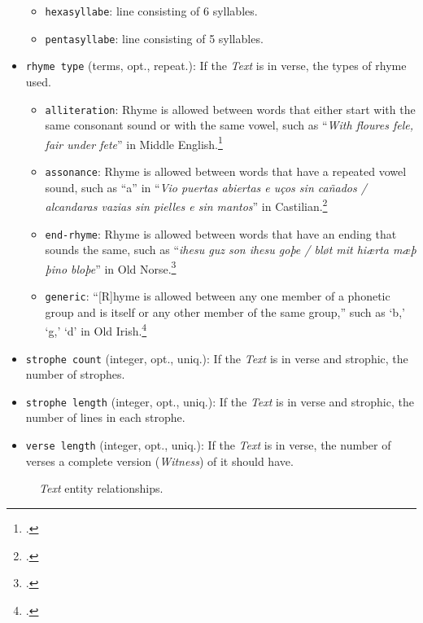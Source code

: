 \begin{itemize}
\begin{itemize}
            \item \texttt{hexasyllabe}: line consisting of 6 syllables.
            \item \texttt{pentasyllabe}: line consisting of 5 syllables.
        \end{itemize}
    \item \texttt{rhyme type} (terms, opt., repeat.): If the \textit{Text} is in verse, the types of rhyme used.
        \begin{itemize}
            \item \texttt{alliteration}: Rhyme is allowed between words that either start with the same consonant sound or with the same vowel, such as ``\textit{With floures fele, fair under fete}'' in Middle English.\footcite[][396]{Davis2002}
            \item \texttt{assonance}: Rhyme is allowed between words that have a repeated vowel sound, such as ``a'' in ``\textit{Vio puertas abiertas e uços sin cañados / alcandaras vazias sin pielles e sin mantos}'' in Castilian.\footcite[][364]{Gornall1995}
            \item \texttt{end-rhyme}: Rhyme is allowed between words that have an ending that sounds the same, such as ``\textit{ihesu guz son ihesu goþe / bløt mit hiærta mæþ þino bloþe}'' in Old Norse.\footcite[][423]{Layher2008}
            \item \texttt{generic}: ``[R]hyme is allowed between any one member of a phonetic group and is itself or any other member of the same group,'' such as `b,' `g,' `d' in Old Irish.\footcite[][822]{McKie1997}
        \end{itemize}
    \item \texttt{strophe count} (integer, opt., uniq.): If the \textit{Text} is in verse and strophic, the number of strophes.
    \item \texttt{strophe length} (integer, opt., uniq.): If the \textit{Text} is in verse and strophic, the number of lines in each strophe.
    \item \texttt{verse length} (integer, opt., uniq.): If the \textit{Text} is in verse, the number of verses a complete version (\textit{Witness}) of it should have.
\end{itemize}

\begin{figure}[ht]
    \begin{center}
        
    \end{center}
\label{fig:TextER}
\caption{\textit{Text} entity relationships.}
\end{figure}

